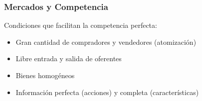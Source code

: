 \documentclass[dvipsnames,table]{beamer}
\begin{document}
	\begin{frame}
			\frametitle{Mercados y Competencia}
			Condiciones que facilitan la competencia perfecta:
			\begin{itemize}
				\item Gran cantidad de compradores y vendedores (atomización)
				\item Libre entrada y salida de oferentes
				\item Bienes homogéneos
				\item Información perfecta (acciones) y completa (características)
			\end{itemize}			
		\end{frame}				
		
\end{document}
